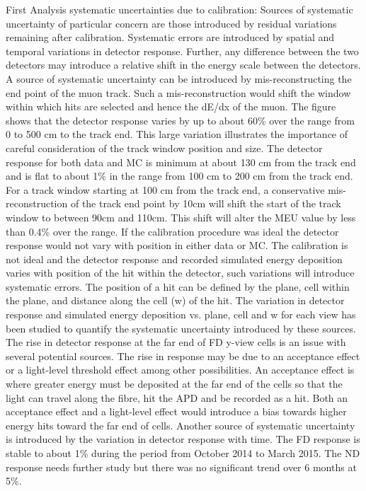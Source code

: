 \documentclass[12pt,a4paper]{article}
\begin{document}
First Analysis systematic uncertainties due to calibration:
Sources of systematic uncertainty of particular concern are those introduced by residual variations remaining after calibration. Systematic errors are introduced by spatial and temporal variations in detector response. Further, any difference between the two detectors may introduce a relative shift in the energy scale between the detectors. A source of systematic uncertainty can be introduced by mis-reconstructing the end point of the muon track. Such a mis-reconstruction would shift the window within which hits are selected and hence the dE/dx of the muon.  The figure shows that the detector response varies by up to about 60\% over the range from 0 to 500 cm to the track end. This large variation illustrates the importance of careful consideration of the track window position and size. The detector response for both data and MC is minimum at about 130 cm from the track end and is flat to about 1\% in the range from 100 cm to 200 cm from the track end. For a track window starting at 100 cm from the track end, a conservative mis-reconstruction of the track end point by 10cm will shift the start of the track window to between 90cm and 110cm. This shift will alter the MEU value by less than 0.4\% over the range.
If the calibration procedure was ideal the detector response would not vary with position in either data or MC. The calibration is not ideal and the detector response and recorded simulated energy deposition varies with position of the hit within the detector, such variations will introduce systematic errors. The position of a hit can be defined by the plane, cell within the plane, and distance along the cell (w) of the hit. The variation in detector response and simulated energy deposition vs. plane, cell and w for each view has been studied to quantify the systematic uncertainty introduced by these sources.
The rise in detector response at the far end of FD y-view cells is an issue with several potential sources. The rise in response may be due to an acceptance effect or a light-level threshold effect among other possibilities. An acceptance effect is where greater energy must be deposited at the far end of the cells so that the light can travel along the fibre, hit the APD and be recorded as a hit. Both an acceptance effect and a light-level effect would introduce a bias towards higher energy hits toward the far end of cells.
Another source of systematic uncertainty is introduced by the variation in detector response with time. The FD response is stable to about 1\% during the period from October 2014 to March 2015. The ND response needs further study but there was no significant trend over 6 months at 5\%. 
\end{document}
